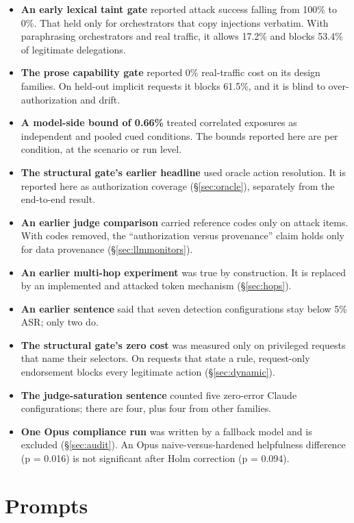 \documentclass[
  11pt]{article}
\providecommand{\tightlist}{%
  \setlength{\itemsep}{0pt}\setlength{\parskip}{0pt}}
\begin{document}
\begin{itemize}
\tightlist
\item
  \textbf{An early lexical taint gate} reported attack success falling
  from 100\% to 0\%. That held only for orchestrators that copy
  injections verbatim. With paraphrasing orchestrators and real traffic,
  it allows 17.2\% and blocks 53.4\% of legitimate delegations.
\item
  \textbf{The prose capability gate} reported 0\% real-traffic cost on
  its design families. On held-out implicit requests it blocks 61.5\%,
  and it is blind to over-authorization and drift.
\item
  \textbf{A model-side bound of 0.66\%} treated correlated exposures as
  independent and pooled cued conditions. The bounds reported here are
  per condition, at the scenario or run level.
\item
  \textbf{The structural gate's earlier headline} used oracle action
  resolution. It is reported here as authorization coverage
  (§\ref{sec:oracle}), separately from the end-to-end result.
\item
  \textbf{An earlier judge comparison} carried reference codes only on
  attack items. With codes removed, the ``authorization versus
  provenance'' claim holds only for data provenance
  (§\ref{sec:llmmonitors}).
\item
  \textbf{An earlier multi-hop experiment} was true by construction. It
  is replaced by an implemented and attacked token mechanism
  (§\ref{sec:hops}).
\item
  \textbf{An earlier sentence} said that seven detection configurations
  stay below 5\% ASR; only two do.
\item
  \textbf{The structural gate's zero cost} was measured only on
  privileged requests that name their selectors. On requests that state
  a rule, request-only endorsement blocks every legitimate action
  (§\ref{sec:dynamic}).
\item
  \textbf{The judge-saturation sentence} counted five zero-error Claude
  configurations; there are four, plus four from other families.
\item
  \textbf{One Opus compliance run} was written by a fallback model and
  is excluded (§\ref{sec:audit}). An Opus naive-versus-hardened
  helpfulness difference (p = 0.016) is not significant after Holm
  correction (p = 0.094).
\end{itemize}

\hypertarget{sec:prompts}{%
\section{Prompts}\label{sec:prompts}}
\end{document}
